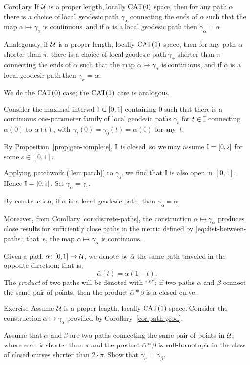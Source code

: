 \begin{thm}{Corollary}\label{cor:path-geod}
If $\mathcal{U}$ is a proper length, locally $\mathrm{CAT}(0)$ space, then 
for any path $\alpha$ there is a choice of   local geodesic path $\gamma_\alpha$  connecting the ends of $\alpha$ such that the map $\alpha\mapsto\gamma_\alpha$ is continuous, and if $\alpha$ is a local geodesic path then $\gamma_\alpha=\alpha$. 

Analogously, if $\mathcal{U}$ is a proper length, locally $\mathrm{CAT}(1)$ space, then 
for any path $\alpha$ shorter than $\pi$,  
there is a choice of  local geodesic path $\gamma_\alpha$ shorter than $\pi$ connecting the ends of $\alpha$ such that the map $\alpha\mapsto\gamma_\alpha$ is continuous, and if $\alpha$ is a local geodesic path then $\gamma_\alpha=\alpha$.
\end{thm}

We do the $\mathrm{CAT}(0)$ case;
the $\mathrm{CAT}(1)$ case is analogous.

Consider the maximal interval $\mathbb{I}\subset[0,1]$ containing $0$
such that there is a continuous one-parameter family of 
local geodesic paths $\gamma_t$ for $t\in \mathbb{I}$ connecting $\alpha(0)$ to $\alpha(t)$, with $\gamma_t(0)=\gamma_0(t)=\alpha(0)$ for any~$t$. 

By Proposition~\ref{prop:geo-complete}, $\mathbb{I}$ is closed,
so we may assume $\mathbb{I}=[0,s]$ for some $s\in [0,1]$.

Applying  patchwork (\ref{lem:patch}) to  $\gamma_{s}$, 
we find that $\mathbb{I}$ is also open in $[0,1]$. 
Hence $\mathbb{I}=[0,1]$.
Set $\gamma_\alpha=\gamma_1$.

By construction,  if $\alpha$ is a local geodesic path, then $\gamma_\alpha=\alpha$. 

Moreover, from Corollary \ref{cor:discrete-paths},
the construction $\alpha\mapsto \gamma_\alpha$ produces close results for sufficiently close paths in the metric defined by \ref{eq:dist-between-paths};
that is, the map  $\alpha\mapsto \gamma_\alpha$ is continuous.
\qeds

Given a path $\alpha\colon[0,1]\to\mathcal{U}$,
we denote by $\bar\alpha$ the same path traveled in the opposite direction;
that is,
\[\bar\alpha(t)=\alpha(1-t).\]
The \emph{product} of two paths  will be denoted with ``$*$'';
if two paths $\alpha$ and $\beta$ connect the same pair of points, then the product $\bar\alpha*\beta$ is a closed curve.

\begin{thm}{Exercise}\label{ex:null-homotopic}
Assume $\mathcal{U}$ is a proper length, locally $\mathrm{CAT}(1)$ space. 
Consider the construction $\alpha\mapsto\gamma_\alpha$ provided by Corollary~\ref{cor:path-geod}.

Assume that $\alpha$ and $\beta$ are two paths connecting the same pair of points in $\mathcal{U}$, where 
each is shorter than $\pi$ 
and the product  
$\bar\alpha*\beta$ is null-homotopic in the class of closed curves shorter than $2\cdot\pi$.
Show that $\gamma_\alpha=\gamma_\beta$.
\end{thm}

